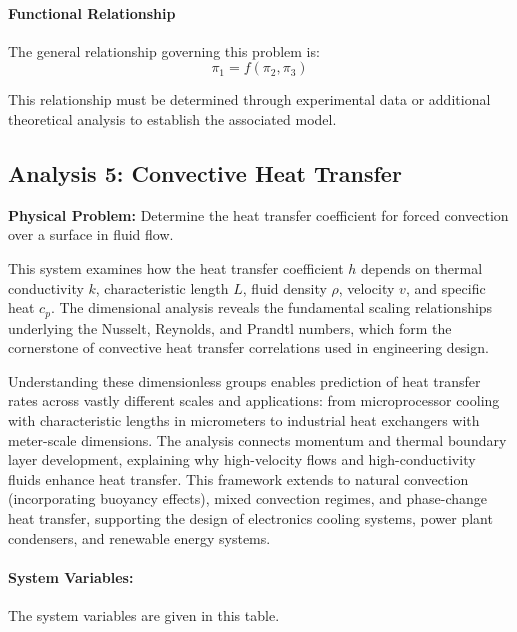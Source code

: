                     \paragraph{Functional Relationship}
                    The general relationship governing this problem is:
                    \begin{equation}
                    \pi_1 = f(\pi_2,\pi_3)
                    \end{equation}

                    This relationship must be determined through experimental data or additional theoretical analysis to establish the associated model.


\subsection{Analysis 5: Convective Heat Transfer}
\label{sec:Convective_Heat_Transfer}

\begin{problembox}
\textbf{Physical Problem:} Determine the heat transfer coefficient for forced convection over a surface in fluid flow.
\end{problembox}

This system examines how the heat transfer coefficient $h$ depends on thermal conductivity $k$, characteristic length $L$, fluid density $\rho$, velocity $v$, and specific heat $c_p$. The dimensional analysis reveals the fundamental scaling relationships underlying the Nusselt, Reynolds, and Prandtl numbers, which form the cornerstone of convective heat transfer correlations used in engineering design.



Understanding these dimensionless groups enables prediction of heat transfer rates across vastly different scales and applications: from microprocessor cooling with characteristic lengths in micrometers to industrial heat exchangers with meter-scale dimensions. The analysis connects momentum and thermal boundary layer development, explaining why high-velocity flows and high-conductivity fluids enhance heat transfer. This framework extends to natural convection (incorporating buoyancy effects), mixed convection regimes, and phase-change heat transfer, supporting the design of electronics cooling systems, power plant condensers, and renewable energy systems.

\paragraph{System Variables: } The system variables are given in this table.


